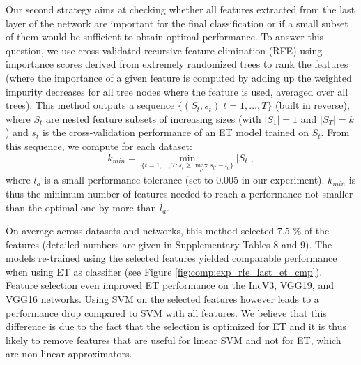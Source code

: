 Our second strategy aims at checking whether all features extracted from the last layer of the network are important for the final classification or if a small subset of them would be sufficient to obtain optimal performance. To answer this question, we use cross-validated recursive feature elimination (RFE) \parencite{guyon2002gene} using importance scores derived from extremely randomized trees to rank the features (where the importance of a given feature is computed by adding up the weighted impurity decreases for all tree nodes where the feature is used, averaged over all trees). This method outputs a sequence $\{(S_t,s_t)|t=1,\ldots,T\}$ (built in reverse), where $S_t$ are nested feature subsets of increasing sizes (with $|S_1|=1$ and $|S_T|=k$) and $s_t$ is the cross-validation performance of an ET model trained on $S_t$. From this sequence, we compute for each dataset:
$$k_{min} = \min_{\{t=1,\ldots,T: s_t\geq \max_{t'} s_{t'}-l_a\}} |S_t|,$$
where $l_a$ is a small performance tolerance (set to $0.005$ in our experiment). $k_{min}$ is thus the minimum number of features needed to reach a performance not smaller than the optimal one by more than $l_a$.




On average across datasets and networks, this method selected 7.5 \% of the features (detailed numbers are given in Supplementary Tables 8 and 9). The models re-trained using the selected features yielded comparable performance when using ET as classifier (see Figure \ref{fig:comp:exp_rfe_last_et_cmp}). Feature selection even improved ET performance on the IncV3, VGG19, and VGG16 networks. Using SVM on the selected features however leads to a performance drop compared to SVM with all features. We believe that this difference is due to the fact that the selection is optimized for ET and it is thus likely to remove features that are useful for linear SVM and not for ET, which are non-linear approximators.

